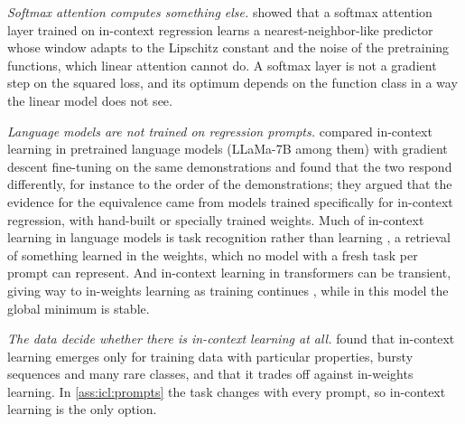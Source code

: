 \begin{refsection}
\emph{Softmax attention computes something else.} \Textcite{CollinsEtAl2024} showed that a softmax attention layer trained on in-context regression learns a nearest-neighbor-like predictor whose window adapts to the Lipschitz constant and the noise of the pretraining functions, which linear attention cannot do. A softmax layer is not a gradient step on the squared loss, and its optimum depends on the function class in a way the linear model does not see.

\emph{Language models are not trained on regression prompts.} \Textcite{ShenEtAl2024} compared in-context learning in pretrained language models (LLaMa-7B among them) with gradient descent fine-tuning on the same demonstrations and found that the two respond differently, for instance to the order of the demonstrations; they argued that the evidence for the equivalence came from models trained specifically for in-context regression, with hand-built or specially trained weights. Much of in-context learning in language models is task recognition rather than learning \parencite{PanEtAl2023,MinEtAl2022}, a retrieval of something learned in the weights, which no model with a fresh task per prompt can represent. And in-context learning in transformers can be transient, giving way to in-weights learning as training continues \parencite{SinghEtAl2023}, while in this model the global minimum is stable.

\emph{The data decide whether there is in-context learning at all.} \Textcite{ChanEtAl2022} found that in-context learning emerges only for training data with particular properties, bursty sequences and many rare classes, and that it trades off against in-weights learning. In \cref{ass:icl:prompts} the task changes with every prompt, so in-context learning is the only option.


\end{refsection}
